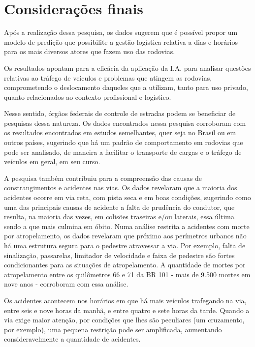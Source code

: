 \chapter{Considerações finais}\label{intro:resumen}

Após a realização dessa pesquisa, os dados sugerem que é possível propor um modelo de predição que possibilite a gestão logística relativa a dias e horários para os mais diversos atores que fazem uso das rodovias.  

Os resultados apontam para a eficácia da aplicação da
I.A. para analisar questões relativas ao tráfego de veículos e problemas que atingem as rodovias, comprometendo o deslocamento daqueles que a utilizam, tanto para uso privado, quanto relacionados ao contexto profissional e logístico. 

Nesse sentido, órgãos federais de controle de estradas podem se beneficiar de pesquisas dessa natureza. 
Os dados encontrados nessa pesquisa corroboram com os resultados encontrados em estudos semelhantes, quer seja no Brasil ou em outros países, sugerindo que há um padrão de comportamento em rodovias que pode ser analisado, de maneira a facilitar o transporte de cargas e o tráfego de veículos em geral, em seu curso. 

A pesquisa também contribuiu para a compreensão das causas de constrangimentos e acidentes nas vias. Os dados revelaram que a maioria dos acidentes ocorre em via reta, com pista seca e em boas condições, sugerindo como uma das principais causas de acidente a falta de prudência do condutor, que resulta, na maioria das vezes, em colisões traseiras e/ou laterais, essa última sendo a que mais culmina em óbito. Numa análise restrita a acidentes com morte por atropelamento, os dados revelaram que próximo aos perímetros urbanos não há uma estrutura segura para o pedestre atravessar a via. Por exemplo, falta de sinalização, passarelas, limitador de velocidade e faixa de pedestre são fortes condicionantes para as situações de atropelamento. A quantidade de mortes por atropelamento entre os quilômetros 66 e 71 da BR 101 - mais de 9.500 mortes em nove anos - corroboram com essa análise.

Os acidentes acontecem nos horários em que há mais veículos trafegando na via, entre seis e nove horas da manhã, e entre quatro e sete horas da tarde. Quando a via exige maior atenção, por condições que lhes são peculiares (um cruzamento, por exemplo), uma pequena restrição pode ser amplificada, aumentando consideravelmente a quantidade de acidentes.

